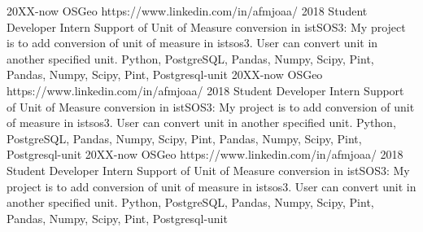 
\horizontalLineRight

\listItemOne
    {20XX-now}
    {OSGeo}
    {https://www.linkedin.com/in/afmjoaa/}
    {2018 Student Developer Intern}
    {Support of Unit of Measure conversion in istSOS3: My project is to add conversion of
    unit of measure in istsos3. User can convert unit in another specified unit.}
    {Python, PostgreSQL, Pandas, Numpy, Scipy, Pint,  Pandas, Numpy, Scipy, Pint, Postgresql-unit}
\listItemOne
    {20XX-now}
    {OSGeo}
    {https://www.linkedin.com/in/afmjoaa/}
    {2018 Student Developer Intern}
    {Support of Unit of Measure conversion in istSOS3: My project is to add conversion of
    unit of measure in istsos3. User can convert unit in another specified unit.}
    {Python, PostgreSQL, Pandas, Numpy, Scipy, Pint,  Pandas, Numpy, Scipy, Pint, Postgresql-unit}
\listItemOne
    {20XX-now}
    {OSGeo}
    {https://www.linkedin.com/in/afmjoaa/}
    {2018 Student Developer Intern}
    {Support of Unit of Measure conversion in istSOS3: My project is to add conversion of
    unit of measure in istsos3. User can convert unit in another specified unit.}
    {Python, PostgreSQL, Pandas, Numpy, Scipy, Pint,  Pandas, Numpy, Scipy, Pint, Postgresql-unit}%